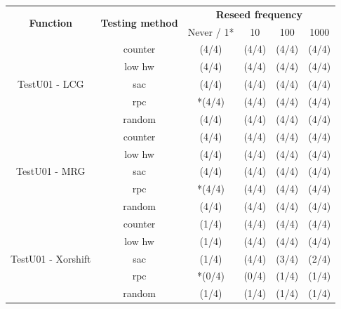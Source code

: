\documentclass[
    digital,    %
    oneside,    %
    color,
    11pt,
    nocover,
    notable,
    nolof,
    nolot,
    final
]{fithesis3}
\newcommand{\fd}{\cellcolor{red!25}}
\newcommand{\fn}{\cellcolor{green!25}}
\renewcommand\_{\textunderscore\allowbreak}
\newcommand{\cmark}{\ding{51}}%
\newcommand{\xmark}{\ding{55}}%
\begin{document}
\begin{table}[H]
	\centering
	\begin{tabular}{|c|c|c|c|c|c|}
		\hline
		\multirow{2}{*}{\textbf{\large Function}} & \multirow{2}{*}{\textbf{\large Testing method}} & 
		\multicolumn{4}{c|}{\textbf{\large Reseed frequency}} \\ \cline{3-6}
		& & Never / 1* & 10 & 100 & 1000 \\ \hline \hline
		
		\multirow{5}{*}{TestU01 - LCG} & counter &  \fd \xmark (4/4) & \fd \xmark (4/4) & \fd \xmark (4/4) & \fd \xmark (4/4) \\ \cline{2-6}
		& low hw &  \fd \xmark (4/4) & \fd \xmark (4/4) & \fd \xmark (4/4) & \fd \xmark (4/4) \\ \cline{2-6}
		& sac &  \fd \xmark (4/4) & \fd \xmark (4/4) & \fd \xmark (4/4) & \fd \xmark (4/4) \\ \cline{2-6}
		& rpc &  *\fd \xmark (4/4) & \fd \xmark (4/4) & \fd \xmark (4/4) & \fd \xmark (4/4) \\ \cline{2-6}
		& random &  \fd \xmark (4/4) & \fd \xmark (4/4) & \fd \xmark (4/4) & \fd \xmark (4/4) \\
		\hline \hline
		
		\multirow{5}{*}{TestU01 - MRG} & counter &  \fd \xmark (4/4) & \fd \xmark (4/4) & \fd \xmark (4/4) & \fd \xmark (4/4) \\ \cline{2-6}
		& low hw &  \fd \xmark (4/4) & \fd \xmark (4/4) & \fd \xmark (4/4) & \fd \xmark (4/4) \\ \cline{2-6}
		& sac &  \fd \xmark (4/4) & \fd \xmark (4/4) & \fd \xmark (4/4) & \fd \xmark (4/4) \\ \cline{2-6}
		& rpc &  *\fd \xmark (4/4) & \fd \xmark (4/4) & \fd \xmark (4/4) & \fd \xmark (4/4) \\ \cline{2-6}
		& random &  \fd \xmark (4/4) & \fd \xmark (4/4) & \fd \xmark (4/4) & \fd \xmark (4/4) \\
		\hline \hline
		
		\multirow{5}{*}{TestU01 - Xorshift} & counter &  \fd \xmark (1/4) & \fd \xmark (4/4) & \fd \xmark (4/4) & \fd \xmark (4/4) \\ \cline{2-6}
		& low hw &  \fd \xmark (1/4) & \fd \xmark (4/4) & \fd \xmark (4/4) & \fd \xmark (4/4) \\ \cline{2-6}
		& sac &  \fd \xmark (1/4) & \fd \xmark (4/4) & \fd \xmark (3/4) & \fd \xmark (2/4) \\ \cline{2-6}
		& rpc &  *\fn \cmark (0/4) & \fn \cmark (0/4) & \fd \xmark (1/4) & \fd \xmark (1/4) \\ \cline{2-6}
		& random &  \fd \xmark (1/4) & \fd \xmark (1/4) & \fd \xmark (1/4) & \fd \xmark (1/4) \\
		\hline \hline
		

\end{tabular}
\end{table}
\end{document}
